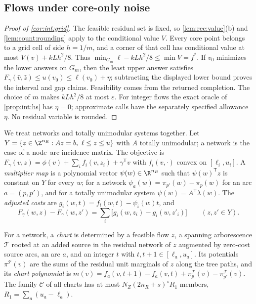 \subsection{Flows under core-only noise}\label{app:int:flows}

\begin{proof}[Proof of \cref{cor:int:grid}]
The feasible residual set is fixed, so \cref{lem:rec:value}(b) and
\cref{lem:count:rounding} apply to the conditional value $V$. Every core
point belongs to a grid cell of side $h=1/m$, and a corner of that cell
has conditional value at most $V(v)+kLh^2/8$. Thus
$\min_{G_m}\ell-kLh^2/8\le\min V=f^*$. If $v_0$ minimizes the lower
answers on $G_m$, then the least upper answer satisfies
$F_\gamma(\hat v,\hat z)\le u(v_0)\le\ell(v_0)+\eta$; subtracting the
displayed lower bound proves the interval and gap claims. Feasibility
comes from the returned completion. The choice of $m$ makes $kLh^2/8$
at most $\varepsilon$. For integer flows the exact oracle of
\cref{prop:int:hs} has $\eta=0$; approximate calls have the separately
specified allowance $\eta$. No residual variable is rounded.
\end{proof}

We treat networks and totally unimodular systems together. Let
$Y=\{z\in\Z^{n_R}:Az=b,\ \ell\le z\le u\}$ with $A$ totally unimodular; a network
is the case of a node--arc incidence matrix. The objective is
$F_\gamma(v,z)=\phi(v)+\sum_if_i(v,z_i)+\gamma^{\mathsf T}v$ with $f_i(v,\cdot)$
convex on $[\ell_i,u_i]$. A \emph{multiplier map} is a polynomial vector
$\psi(w)\in\R^{n_R}$ such that $\psi(w)^{\mathsf T}z$ is constant on $Y$ for every
$w$; for a network $\psi_a(w)=\pi_{p'}(w)-\pi_p(w)$ for an arc $a=(p,p')$, and for a
totally unimodular system $\psi(w)=A^{\mathsf T}\lambda(w)$. The \emph{adjusted
costs} are $g_i(w,t)=f_i(w,t)-\psi_i(w)t$, and
\begin{equation}\label{eq:app:int:adjusted}
 F_\gamma(w,z)-F_\gamma(w,z')=\sum_i\bigl[g_i(w,z_i)-g_i(w,z'_i)\bigr]
 \qquad(z,z'\in Y).
\end{equation}

\begin{definition}[Charts]\label{def:int:charts}
For a network, a \emph{chart} is determined by a feasible flow $z$, a spanning
arborescence $\mathcal T$ rooted at an added source in the residual network of
$z$ augmented by zero-cost source arcs, an arc $a$, and an integer $t$ with
$t,t+1\in[\ell_a,u_a]$. Its potentials $\pi^{\mathcal T}(v)$ are the sums of the
residual unit marginals of $z$ along the tree paths, and its \emph{chart
polynomial} is $m(v)=f_a(v,t+1)-f_a(v,t)+\pi^{\mathcal T}_p(v)-\pi^{\mathcal T}_{p'}(v)$.
The family $\mathcal C$ of all charts has at most
$N_Z(2n_R+s)^sR_1$ members, $R_1=\sum_a(u_a-\ell_a)$.
\end{definition}


